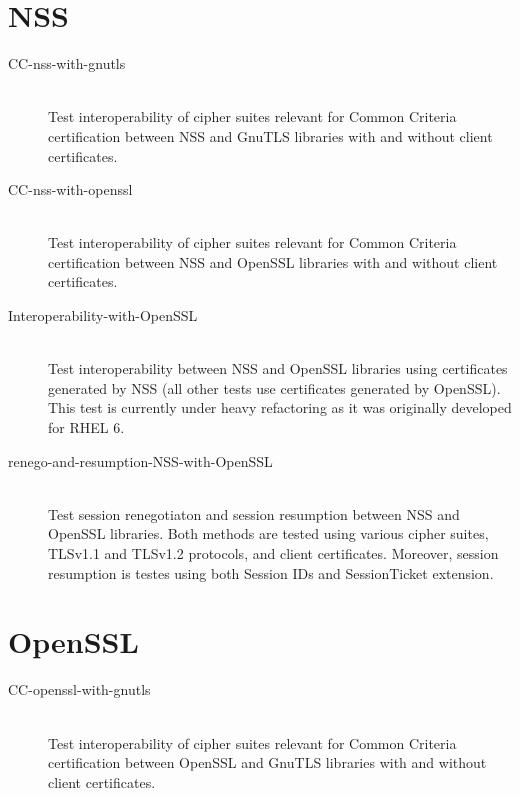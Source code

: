 \section{NSS}
    \begin{description}
        \item[CC-nss-with-gnutls] \hfill  \\
            Test interoperability of cipher suites relevant for Common Criteria
            certification between NSS and GnuTLS libraries with and without
            client certificates.
        \item[CC-nss-with-openssl] \hfill  \\
            Test interoperability of cipher suites relevant for Common Criteria
            certification between NSS and OpenSSL libraries with and without
            client certificates.
        \item[Interoperability-with-OpenSSL] \hfill  \\
            Test interoperability between NSS and OpenSSL libraries using
            certificates generated by NSS (all other tests use certificates
            generated by OpenSSL). This test is currently under heavy
            refactoring as it was originally developed for RHEL 6.
        \item[renego-and-resumption-NSS-with-OpenSSL] \hfill  \\
            Test session renegotiaton and session resumption between NSS and
            OpenSSL libraries. Both methods are tested using various cipher
            suites, TLSv1.1 and TLSv1.2 protocols, and client certificates.
            Moreover, session resumption is testes using both Session IDs and
            SessionTicket extension.
    \end{description}
\section{OpenSSL}
    \begin{description}
        \item[CC-openssl-with-gnutls] \hfill \\
            Test interoperability of cipher suites relevant for Common Criteria
            certification between OpenSSL and GnuTLS libraries with and without
            client certificates.
    \end{description}

